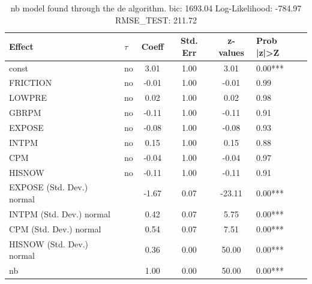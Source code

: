 \begin{table}
	\caption{nb model found through the de algorithm. bic: 1693.04 Log-Likelihood: -784.97 RMSE_TEST: 211.72}
	\begin{center}
		\begin{tabular}{|l|l|c|c|c|l|}
			\hline
			Effect & $\tau$ & Coeff & Std. Err & z-values & Prob |z|>Z \\
			\hline
			const & no & 3.01 & 1.00 & 3.01 & 0.00*** \\
			\hline
			FRICTION & no & -0.01 & 1.00 & -0.01 & 0.99 \\
			\hline
			LOWPRE & no & 0.02 & 1.00 & 0.02 & 0.98 \\
			\hline
			GBRPM & no & -0.11 & 1.00 & -0.11 & 0.91 \\
			\hline
			EXPOSE & no & -0.08 & 1.00 & -0.08 & 0.93 \\
			\hline
			INTPM & no & 0.15 & 1.00 & 0.15 & 0.88 \\
			\hline
			CPM & no & -0.04 & 1.00 & -0.04 & 0.97 \\
			\hline
			HISNOW & no & -0.11 & 1.00 & -0.11 & 0.91 \\
			\hline
			EXPOSE (Std. Dev.) normal &  & -1.67 & 0.07 & -23.11 & 0.00*** \\
			\hline
			INTPM (Std. Dev.) normal &  & 0.42 & 0.07 & 5.75 & 0.00*** \\
			\hline
			CPM (Std. Dev.) normal &  & 0.54 & 0.07 & 7.51 & 0.00*** \\
			\hline
			HISNOW (Std. Dev.) normal &  & 0.36 & 0.00 & 50.00 & 0.00*** \\
			\hline
			nb &  & 1.00 & 0.00 & 50.00 & 0.00*** \\
			\hline
		\end{tabular}
	\end{center}
\end{table}